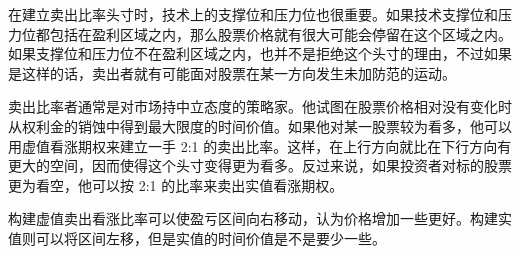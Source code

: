 在建立卖出比率头寸时，技术上的支撑位和压力位也很重要。如果技术支撑位和压力位都包括在盈利区域之内，那么股票价格就有很大可能会停留在这个区域之内。如果支撑位和压力位不在盈利区域之内，也并不是拒绝这个头寸的理由，不过如果是这样的话，卖出者就有可能面对股票在某一方向发生未加防范的运动。

卖出比率者通常是对市场持中立态度的策略家。他试图在股票价格相对没有变化时从权利金的销蚀中得到最大限度的时间价值。如果他对某一股票较为看多，他可以用虚值看涨期权来建立一手 2:1 的卖出比率。这样，在上行方向就比在下行方向有更大的空间，因而使得这个头寸变得更为看多。反过来说，如果投资者对标的股票更为看空，他可以按 2:1 的比率来卖出实值看涨期权。
\begin{tcolorbox}
    构建虚值卖出看涨比率可以使盈亏区间向右移动，认为价格增加一些更好。构建实值则可以将区间左移，但是实值的时间价值是不是要少一些。
\end{tcolorbox}